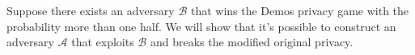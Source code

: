 \documentclass[12pt]{article}
\begin{document}
 Suppose there exists an adversary $\mathcal{B}$ that wins the Demos privacy game with the probability more than one half. We will show that it's possible to construct an adversary $\mathcal{A}$ that exploits $\mathcal{B}$ and breaks the modified original privacy. \\
\end{document}
